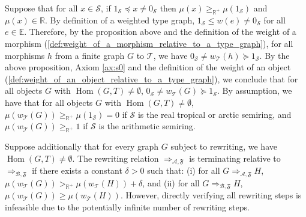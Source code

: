 
    Suppose that for all $x \in \mathcal{S}$, if $ 1_\mathcal{S} \preceq x \neq 0_\mathcal{S}$ then $\mu(x) \geq_{\mathbb{R}^+} \mu(1_\mathcal{S})$ and $\mu(x) \in \mathbb{R}$. 
    By definition of a weighted type graph, $1_\mathcal{S} \leq w(e)\neq 0_\mathcal{S}$ for all $e\in\mathbb{E}$.
    Therefore, by the proposition above and the definition of the weight of a morphism (\autoref{def:weight_of_a_morphism_relative_to_a_type_graph}), for all morphisms \( h \) from a finite graph $G$ to $\mathcal{T}$, we have \( 0_\mathcal{S} \neq w_\mathcal{T}(h) \succeq 1_\mathcal{S} \). 
    By the above proposition, Axiom \eqref{ax:s0} and the definition of the weight of an object (\autoref{def:weight_of_an_object_relative_to_a_type_graph}), we conclude that for all objects \( G \) with $\operatorname{Hom}(G,T)\neq \emptyset$, \( 0_\mathcal{S} \neq w_\mathcal{T}(G) \succeq 1_\mathcal{S} \). By assumption, we have that for all objects \( G \) with $\operatorname{Hom}(G,T)\neq \emptyset$, \( \mu(w_\mathcal{T}(G)) \geq_{\mathbb{R}^+} \mu(1_\mathcal{S}) = 0 \) if $\mathcal{S}$ is the real tropical or arctic semiring, and \( \mu(w_\mathcal{T}(G)) \geq_{\mathbb{R}^+} 1 \) if $\mathcal{S}$ is the arithmetic semiring.

Suppose additionally that for every graph $G$ subject to rewriting, we have $\operatorname{Hom}(G,T)\neq \emptyset$. The rewriting relation \( \Rightarrow_{\mathcal{A},\mathfrak{F}} \) is terminating relative to $\Rightarrow_{\mathcal{B},\mathfrak{F}}$ if there exists a constant $\delta > 0$ such that: (i) for all \(G \Rightarrow_{\mathcal{A},\mathfrak{F}} H\), \( \mu(w_\mathcal{T}(G)) >_{\mathbb{R}^+} \mu(w_\mathcal{T}(H)) + \delta \), and (ii) for all \(G \Rightarrow_{\mathcal{B},\mathfrak{F}} H\), \( \mu(w_\mathcal{T}(G)) \geq \mu(w_\mathcal{T}(H)) \). However, directly verifying all rewriting steps is infeasible due to the potentially infinite number of rewriting steps.


